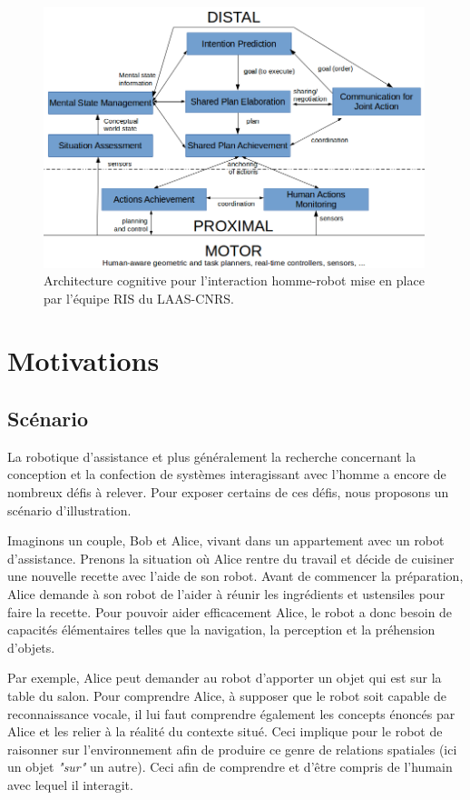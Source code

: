 \documentclass[a4paper,11pt,twoside]{StyleThese}
\begin{document}
\begin{figure}[!t]
        \centering
          \includegraphics[width=0.99\textwidth]{img/cogarch.png}
    \caption{Architecture cognitive pour l'interaction homme-robot mise en place par l'équipe RIS du LAAS-CNRS.}
       \label{fig:archiglobal}
\end{figure}

\section{Motivations}


\subsection{Scénario}

La robotique d'assistance et plus généralement la recherche concernant la conception et la confection de systèmes interagissant avec l'homme a encore de nombreux défis à relever. Pour exposer certains de ces défis, nous proposons un scénario d'illustration.

Imaginons un couple, Bob et Alice, vivant dans un appartement avec un robot d'assistance. Prenons la situation où Alice rentre du travail et décide de cuisiner une nouvelle recette avec l'aide de son robot. Avant de commencer la préparation, Alice demande à son robot de l'aider à réunir les ingrédients et ustensiles pour faire la recette.
Pour pouvoir aider efficacement Alice, le robot a donc besoin de capacités élémentaires telles que la navigation, la perception et la préhension d'objets.

Par exemple, Alice peut demander au robot d'apporter un objet qui est sur la table du salon. Pour comprendre Alice, à supposer que le robot soit capable de reconnaissance vocale, il lui faut comprendre également les concepts énoncés par Alice et les relier à la réalité du contexte situé. Ceci implique pour le robot de raisonner sur l'environnement afin de produire ce genre de relations spatiales (ici un objet \textit{"sur"} un autre). Ceci afin de comprendre et d'être compris de l'humain avec lequel il interagit.
\end{document}

